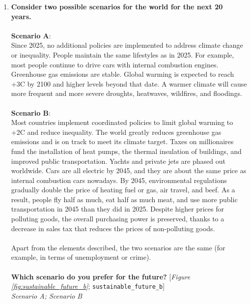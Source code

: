 \begin{enumerate}[resume]
\item  \label{q:sustainable_future_b} \textbf{Consider two possible scenarios for the world for the next 20 years.~\\\\Scenario A}:\\Since 2025, no additional policies are implemented to address climate change or inequality. People maintain the same lifestyles as in 2025. For example, most people continue to drive cars with internal combustion engines. Greenhouse gas emissions are stable. Global warming is expected to reach +3\textdegree{}C by 2100 and higher levels beyond that date. A warmer climate will cause more frequent and more severe droughts, heatwaves, wildfires, and floodings.\\\\\textbf{Scenario B}: \\Most countries implement coordinated policies to limit global warming to +2\textdegree{}C and reduce inequality. The world greatly reduces greenhouse gas emissions and is on track to meet its climate target. Taxes on millionaires fund the installation of heat pumps, the thermal insulation of buildings, and improved public transportation. Yachts and private jets are phased out worldwide. Cars are all electric by 2045, and they are about the same price as internal combustion cars nowadays. By 2045, environmental regulations gradually double the price of heating fuel or gas, air travel, and beef. As a result, people fly half as much, eat half as much meat, and use more public transportation in 2045 than they did in 2025. Despite higher prices for polluting goods, the overall purchasing power is preserved, thanks to a decrease in sales tax that reduces the prices of non-polluting goods.\\\\Apart from the elements described, the two scenarios are the same (for example, in terms of unemployment or crime). \\\\\textbf{Which scenario do you prefer for the future?} [\textit{Figure \ref{fig:sustainable_future_b}}; 
\verb|sustainable_future_b|]
  \\ \textit{Scenario A; Scenario B}


\end{enumerate}
